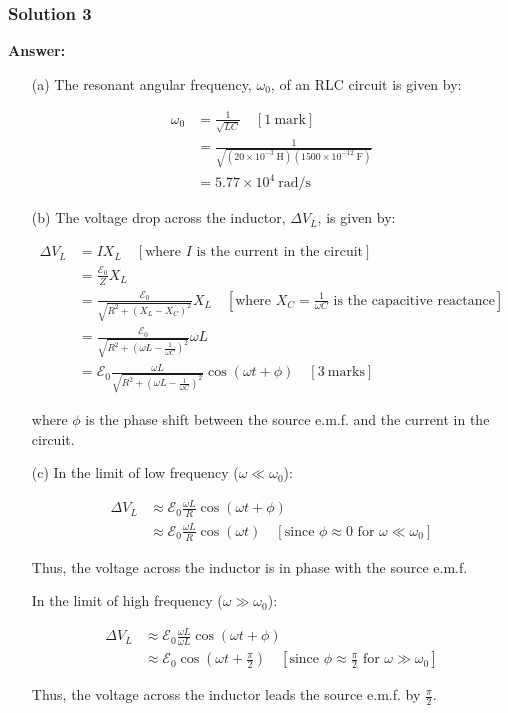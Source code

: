 \documentclass{article}
\begin{document}
\subsubsection{Solution 3}
\textbf{Answer:}

\begin{enumerate}
\item[(a)] The resonant angular frequency, $\omega_0$, of an RLC circuit is given by:

\begin{align*}
\omega_0 &= \frac{1}{\sqrt{LC}} \quad [1~\mathrm{mark}]\\
&= \frac{1}{\sqrt{(20 \times 10^{-3}~\mathrm{H})(1500 \times 10^{-12}~\mathrm{F})}} \\
&= 5.77 \times 10^4~\mathrm{rad/s}
\end{align*}

\item[(b)] The voltage drop across the inductor, $\Delta V_L$, is given by:

\begin{align*}
\Delta V_L &= I X_L \quad [\text{where } I \text{ is the current in the circuit}] \\
&= \frac{\mathcal{E}_0}{Z} X_L \\
&= \frac{\mathcal{E}_0}{\sqrt{R^2 + (X_L - X_C)^2}} X_L \quad [\text{where } X_C = \frac{1}{\omega C} \text{ is the capacitive reactance}] \\
&= \frac{\mathcal{E}_0}{\sqrt{R^2 + (\omega L - \frac{1}{\omega C})^2}} \omega L \\
&= \mathcal{E}_0 \frac{\omega L}{\sqrt{R^2 + (\omega L - \frac{1}{\omega C})^2}} \cos(\omega t + \phi) \quad [3~\mathrm{marks}]
\end{align*}

where $\phi$ is the phase shift between the source e.m.f. and the current in the circuit.

\item[(c)] In the limit of low frequency ($\omega \ll \omega_0$):

\begin{align*}
\Delta V_L &\approx \mathcal{E}_0 \frac{\omega L}{R} \cos(\omega t + \phi) \\
&\approx \mathcal{E}_0 \frac{\omega L}{R} \cos(\omega t) \quad [\text{since } \phi \approx 0 \text{ for } \omega \ll \omega_0]
\end{align*}

Thus, the voltage across the inductor is in phase with the source e.m.f.

In the limit of high frequency ($\omega \gg \omega_0$):

\begin{align*}
\Delta V_L &\approx \mathcal{E}_0 \frac{\omega L}{\omega L} \cos(\omega t + \phi) \\
&\approx \mathcal{E}_0 \cos(\omega t + \frac{\pi}{2}) \quad [\text{since } \phi \approx \frac{\pi}{2} \text{ for } \omega \gg \omega_0]
\end{align*}

Thus, the voltage across the inductor leads the source e.m.f. by $\frac{\pi}{2}$. \quad [2 marks]
\end{enumerate}
\end{document}
